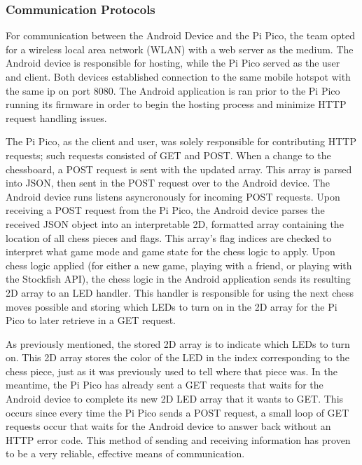 \documentclass[11pt,journal]{IEEEtran}
\begin{document}
\subsubsection{Communication Protocols}
For communication between the Android Device and the Pi Pico, the team opted for a wireless local area network (WLAN) with a web server as the medium. The Android device is responsible for hosting, while the Pi Pico served as the user and client. Both devices established connection to the same mobile hotspot with the same ip on port 8080. The Android application is ran prior to the Pi Pico running its firmware in order to begin the hosting process and minimize HTTP request handling issues.

The Pi Pico, as the client and user, was solely responsible for contributing HTTP requests; such requests consisted of GET and POST. When a change to the chessboard, a POST request is sent with the updated array. This array is parsed into JSON, then sent in the POST request over to the Android device. The Android device runs listens asyncronously for incoming POST requests. Upon receiving a POST request from the Pi Pico, the Android device parses the received JSON object into an interpretable 2D, formatted array containing the location of all chess pieces and flags. This array's flag indices are checked to interpret what game mode and game state for the chess logic to apply. Upon chess logic applied (for either a new game, playing with a friend, or playing with the Stockfish API), the chess logic in the Android application sends its resulting 2D array to an LED handler. This handler is responsible for using the next chess moves possible and storing which LEDs to turn on in the 2D array for the Pi Pico to later retrieve in a GET request.

As previously mentioned, the stored 2D array is to indicate which LEDs to turn on. This 2D array stores the color of the LED in the index corresponding to the chess piece, just as it was previously used to tell where that piece was. In the meantime, the Pi Pico has already sent a GET requests that waits for the Android device to complete its new 2D LED array that it wants to GET. This occurs since every time the Pi Pico sends a POST request, a small loop of GET requests occur that waits for the Android device to answer back without an HTTP error code. This method of sending and receiving information has proven to be a very reliable, effective means of communication.


\end{document}
